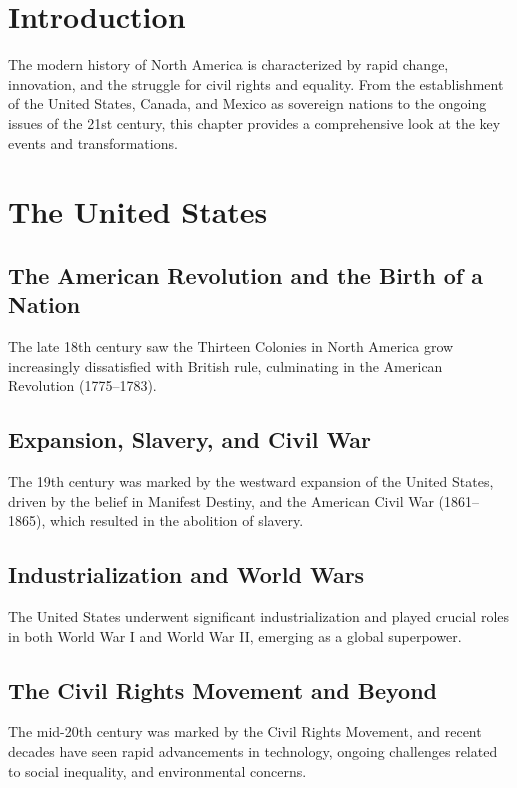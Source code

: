 \documentclass[a4paper,12pt]{book}
\begin{document}
\section{Introduction}
\label{sec:introduction-north-america-modern}
The modern history of North America is characterized by rapid change, innovation, and the struggle for civil rights and equality. From the establishment of the United States, Canada, and Mexico as sovereign nations to the ongoing issues of the 21st century, this chapter provides a comprehensive look at the key events and transformations.

\section{The United States}
\label{sec:united-states}

\subsection{The American Revolution and the Birth of a Nation}
The late 18th century saw the Thirteen Colonies in North America grow increasingly dissatisfied with British rule, culminating in the American Revolution (1775–1783).

\subsection{Expansion, Slavery, and Civil War}
The 19th century was marked by the westward expansion of the United States, driven by the belief in Manifest Destiny, and the American Civil War (1861–1865), which resulted in the abolition of slavery.

\subsection{Industrialization and World Wars}
The United States underwent significant industrialization and played crucial roles in both World War I and World War II, emerging as a global superpower.

\subsection{The Civil Rights Movement and Beyond}
The mid-20th century was marked by the Civil Rights Movement, and recent decades have seen rapid advancements in technology, ongoing challenges related to social inequality, and environmental concerns.
\end{document}
